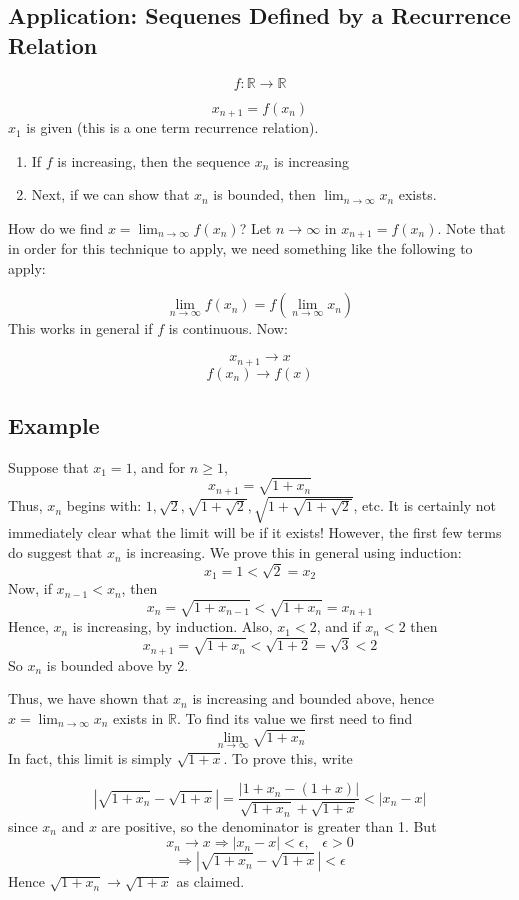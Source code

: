 \documentclass[12pt]{scrbook}
\begin{document}
\subsection{Application: Sequenes Defined by a Recurrence Relation}

\[ f : \mathbb{R} \longrightarrow \mathbb{R} \]

\[ x_{n+1} = f(x_n) \]
$x_1$ is given (this is a one term recurrence relation).  
\begin{enumerate}
\item If $f$ is increasing, then the sequence $x_n$ is increasing
\item Next, if we can show that $x_n$ is bounded, then $\lim_{n \to \infty} x_n$ exists.
\end{enumerate}

How do we find $x = \lim_{n \to \infty} f(x_n)$?  Let $n \rightarrow \infty$ in $x_{n+1} = f(x_n)$.   Note that in order for this technique 
to apply, we need something like the following to apply:

\[\lim_{n \to \infty} f(x_n) = f(\lim_{n \to \infty} x_n) \]
This works in general if $f$ is continuous. Now:

\[ x_{n+1} \rightarrow x \]
\[ f(x_n) \rightarrow f(x) \]

\subsection{Example}
Suppose that $x_1 = 1$, and for $n \ge 1$, 
\[ x_{n+1} = \sqrt{1 + x_n} \]
Thus, $x_n$ begins with: $1, \sqrt{2}, \sqrt{1 + \sqrt{2}}, \sqrt{1 + \sqrt{1 + \sqrt{2}}}$, etc.  It is certainly not immediately clear
what the limit will be if it exists!  However, the first few terms do suggest that $x_n$ is increasing.  We prove this in general
using induction:  
\[ x_1 = 1 < \sqrt{2} = x_2 \]
Now, if $x_{n-1} < x_n$, then 
\[ x_n = \sqrt{1 + x_{n-1}} < \sqrt{1 + x_n} = x_{n+1} \]
Hence, $x_n$ is increasing, by induction.  Also, $x_1 < 2$, and if $x_n < 2$ then 
\[ x_{n+1} = \sqrt{1 + x_n} < \sqrt{1 + 2} = \sqrt{3} < 2 \]
So $x_n$ is bounded above by 2.

Thus, we have shown that $x_n$ is increasing and bounded above, hence $x = \lim_{n \to \infty} x_n$ exists in $\mathbb{R}$.
To find its value we first need to find 
\[ \lim_{n \to \infty} \sqrt{1 + x_n} \]
In fact, this limit is simply $\sqrt{1 + x}$.  To prove this, write

\[ \left| \sqrt{1 + x_n} - \sqrt{1 + x} \right|= \frac{\left| 1 + x_n - (1+x) \right|}{\sqrt{1+x_n} + \sqrt{1 + x}} < |x_n - x| \]
since $x_n$ and $x$ are positive, so the denominator is greater than 1.  But 
\[ x_n \rightarrow x \Rightarrow |x_n - x| < \epsilon, \;\;\; \epsilon > 0 \]
\[ \Rightarrow \left| \sqrt{1 + x_n} - \sqrt{1 + x} \right| < \epsilon \]
Hence 
$\sqrt{1 + x_n}  \rightarrow \sqrt{1 + x}$ as claimed.
\end{document}
